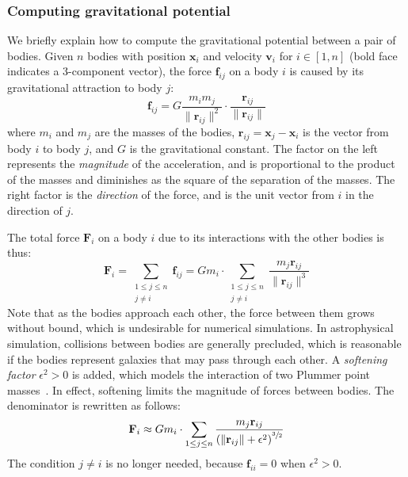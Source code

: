 \subsubsection{Computing gravitational potential}

We briefly explain how to compute the gravitational potential between a pair of
bodies. Given $n$ bodies with position $\mathbf{x}_i$ and velocity
$\mathbf{v}_i$ for $i \in [1,n]$ (bold face indicates a 3-component vector), the
force $\mathbf{f}_{ij}$ on a body $i$ is caused by its gravitational attraction
to body $j$:
%
\begin{equation*}
    \mathbf{f}_{ij}
      = G \frac{m_i m_j}{\|\mathbf{r}_{ij}\|^2}
        \cdot
        \frac{\mathbf{r}_{ij}}{\|\mathbf{r}_{ij}\|}
\end{equation*}
%
where $m_i$ and $m_j$ are the masses of the bodies, $\mathbf{r}_{ij} =
\mathbf{x}_j - \mathbf{x}_i$ is the vector from body $i$ to body $j$, and $G$ is
the gravitational constant. The factor on the left represents the
\emph{magnitude} of the acceleration, and is proportional to the product of the
masses and diminishes as the square of the separation of the masses. The right
factor is the \emph{direction} of the force, and is the unit vector from $i$ in
the direction of $j$.

The total force $\mathbf{F}_i$ on a body $i$ due to its interactions with the
other bodies is thus:
%
\begin{equation*}
    \mathbf{F}_i
      = \sum_{\substack{1 \le j \le n\\j \ne i}} \mathbf{f}_{ij}
      = G m_i \cdot \sum_{\substack{1 \le j \le n\\j \ne i}}
            \frac{m_j \mathbf{r}_{ij}}{\|\mathbf{r}_{ij}\|^3}
\end{equation*}
%
Note that as the bodies approach each other, the force between them grows
without bound, which is undesirable for numerical simulations. In astrophysical
simulation, collisions between bodies are generally precluded, which is
reasonable if the bodies represent galaxies that may pass through each other. A
\emph{softening factor} $\epsilon^2 > 0$ is added, which models the interaction
of two Plummer point masses~\cite{Aarseth:2003uz,Dyer:1993bk}. In effect,
softening limits the magnitude of forces between bodies. The denominator is
rewritten as follows:
%
\begin{equation*}
    \mathbf{F}_i \approx G m_i \cdot \sum_{1 \le j \le n}
        \frac{m_j \mathbf{r}_{ij}}
             {\left( \|\mathbf{r}_{ij}\| + \epsilon^2 \right)^{\sfrac{3}{2}}}
\end{equation*}
%
The condition $j \ne i$ is no longer needed, because $\mathbf{f}_{ii} = 0$ when
$\epsilon^2 > 0$.

